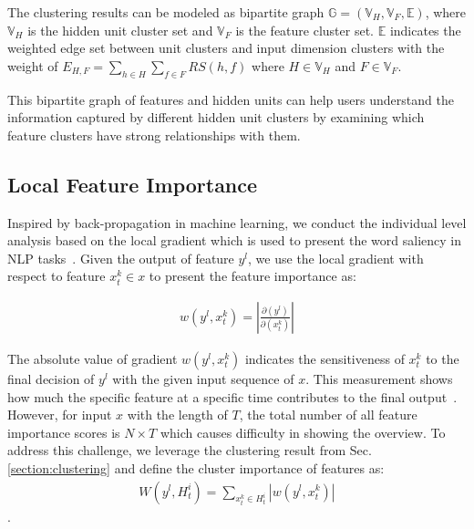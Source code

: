 The clustering results can be modeled as bipartite graph $\mathbb{G} = (\mathbb{V}_H, \mathbb{V}_F, \mathbb{E})$, where $\mathbb{V}_H$ is the hidden unit cluster set and $\mathbb{V}_F$ is the feature cluster set. $\mathbb{E}$ indicates the weighted edge set between unit clusters and input dimension clusters with the weight of $E_{H,F} = \displaystyle\sum_{h \in H}\displaystyle\sum_{f \in F}RS(h, f)$ where $H \in \mathbb{V}_H$ and $F \in \mathbb{V}_F$. 

This bipartite graph of features and hidden units can help users understand the information captured by different hidden unit clusters by examining which feature clusters have strong relationships with them.



\subsection{Local Feature Importance}\label{section:feature_importance}

Inspired by back-propagation in machine learning, we conduct the individual level analysis based on the local gradient which is used to present the word saliency in NLP tasks~\cite{li2015visualizing}. 
Given the output of feature $y^l$, we use the local gradient with respect to feature $x_t^k \in x$ to present the feature importance as:

\begin{equation}
    \label{equation:feature_gradient}
    \begin{multlined}
    w(y^l, x_t^k) = |\frac{\partial(y^l)}{\partial(x_t^k)}|
    \end{multlined}
\end{equation}


The absolute value of gradient $w(y^l, x_t^k)$ indicates the sensitiveness of $x_t^k$ to the final decision of  $y^l$ with the given input sequence of $x$. This measurement shows how much the specific feature at a specific time contributes to the final output~\cite{li2015visualizing}.
However, for input $x$ with the length of $T$,  the total number of all feature importance scores is $N \times T$ which causes difficulty in showing the overview. To address this challenge, we leverage the clustering result from Sec.\ref{section:clustering} and define the cluster importance of features as:
\begin{equation}
    \label{equation:cluster_gradient}
    \begin{multlined}
    W(y^l, H^i_t) =\displaystyle\sum_{x^k_t \in H^i_t}|w(y^l, x^k_t)|
 \end{multlined}
\end{equation}
. 
